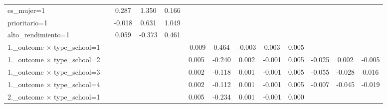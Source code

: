 {\begin{tabular}{l*{12}{c}}
es\_mujer=1          &                     &       0.287         &       1.350\sym{***}&       0.166         &                     &                     &                     &                     &                     &                     &                     &                     \\
prioritario=1       &                     &      -0.018         &       0.631         &       1.049\sym{**} &                     &                     &                     &                     &                     &                     &                     &                     \\
alto\_rendimiento=1  &                     &       0.059         &      -0.373         &       0.461         &                     &                     &                     &                     &                     &                     &                     &                     \\
1.\_outcome $\times$ type\_school=1&                     &                     &                     &                     &      -0.009\sym{**} &       0.464\sym{*}  &      -0.003\sym{***}&       0.003\sym{***}&       0.005         &                     &                     &                     \\
1.\_outcome $\times$ type\_school=2&                     &                     &                     &                     &       0.005\sym{**} &      -0.240\sym{*}  &       0.002\sym{***}&      -0.001\sym{***}&       0.005         &      -0.025         &       0.002         &      -0.005         \\
1.\_outcome $\times$ type\_school=3&                     &                     &                     &                     &       0.002\sym{**} &      -0.118\sym{*}  &       0.001\sym{***}&      -0.001\sym{***}&       0.005         &      -0.055\sym{***}&      -0.028         &       0.016         \\
1.\_outcome $\times$ type\_school=4&                     &                     &                     &                     &       0.002\sym{**} &      -0.112\sym{*}  &       0.001\sym{***}&      -0.001\sym{***}&       0.005         &      -0.007         &      -0.045\sym{**} &      -0.019         \\
2.\_outcome $\times$ type\_school=1&                     &                     &                     &                     &       0.005\sym{**} &      -0.234\sym{*}  &       0.001\sym{***}&      -0.001\sym{***}&       0.000         &                     &                     &                     \\

\end{tabular}}

